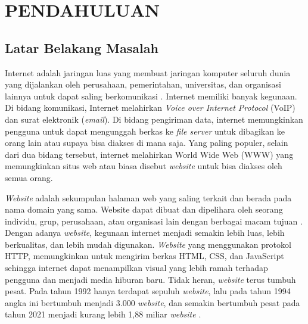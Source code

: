 \chapter{PENDAHULUAN}

\section{Latar Belakang Masalah}

Internet adalah jaringan luas yang membuat jaringan komputer seluruh dunia yang dijalankan oleh perusahaan, pemerintahan, universitas, dan organisasi lainnya untuk dapat saling berkomunikasi \citep{sample2018internet}. Internet memiliki banyak kegunaan. Di bidang komunikasi, Internet melahirkan \textit{Voice over Internet Protocol} (VoIP) dan surat elektronik (\textit{email}). Di bidang pengiriman data, internet memungkinkan pengguna untuk dapat mengunggah berkas ke \textit{file server} untuk dibagikan ke orang lain atau supaya bisa diakses di mana saja. Yang paling populer, selain dari dua bidang tersebut, internet melahirkan World Wide Web (WWW) yang memungkinkan situs web atau biasa disebut \textit{website} untuk bisa diakses oleh semua orang.

\textit{Website} adalah sekumpulan halaman web yang saling terkait dan berada pada nama domain yang sama. Website dapat dibuat dan dipelihara oleh seorang individu, grup, perusahaan, atau organisasi lain dengan berbagai macam tujuan \citep{techopedia2020website}. Dengan adanya \textit{website}, kegunaan internet menjadi semakin lebih luas, lebih berkualitas, dan lebih mudah digunakan. \textit{Website} yang menggunakan protokol HTTP, memungkinkan untuk mengirim berkas HTML, CSS, dan JavaScript sehingga internet dapat menampilkan visual yang lebih ramah terhadap pengguna dan menjadi media hiburan baru. Tidak heran, \textit{website} terus tumbuh pesat. Pada tahun 1992 hanya terdapat sepuluh \textit{website}, lalu pada tahun 1994 angka ini bertumbuh menjadi 3.000 \textit{website}, dan semakin bertumbuh pesat pada tahun 2021 menjadi kurang lebih 1,88 miliar \textit{website} \citep{amstrong2021website}.

